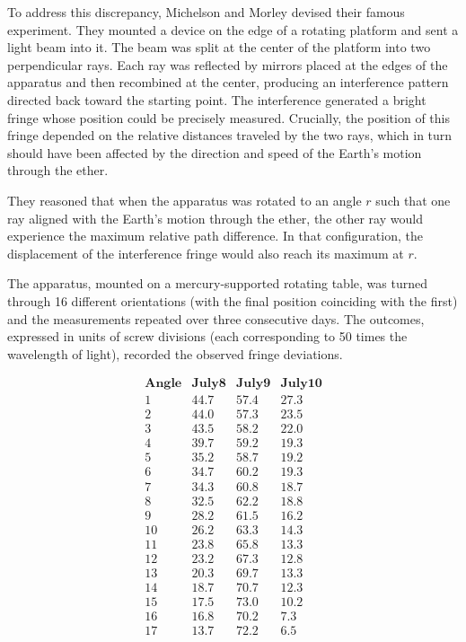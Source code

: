 \documentclass[
]{book}
\begin{document}
To address this discrepancy, Michelson and Morley devised their famous experiment. They mounted a device on the edge of a rotating platform and sent a light beam into it. The beam was split at the center of the platform into two perpendicular rays. Each ray was reflected by mirrors placed at the edges of the apparatus and then recombined at the center, producing an interference pattern directed back toward the starting point. The interference generated a bright fringe whose position could be precisely measured. Crucially, the position of this fringe depended on the relative distances traveled by the two rays, which in turn should have been affected by the direction and speed of the Earth's motion through the ether.

They reasoned that when the apparatus was rotated to an angle \(r\) such that one ray aligned with the Earth's motion through the ether, the other ray would experience the maximum relative path difference. In that configuration, the displacement of the interference fringe would also reach its maximum at \(r\).

The apparatus, mounted on a mercury-supported rotating table, was turned through 16 different orientations (with the final position coinciding with the first) and the measurements repeated over three consecutive days. The outcomes, expressed in units of screw divisions (each corresponding to 50 times the wavelength of light), recorded the observed fringe deviations.

\[
\begin{array}{cccc}
\mathbf{Angle} & \mathbf{July 8} & \mathbf{July 9} & \mathbf{July 10} \\ 
1&   44.7&  57.4&   27.3\\
2&   44.0&  57.3&   23.5\\
3&   43.5&  58.2&   22.0\\
4&   39.7&  59.2&   19.3\\
5&   35.2&  58.7&   19.2\\
6&   34.7&  60.2&   19.3\\
7&   34.3&  60.8&   18.7\\
8&   32.5&  62.2&   18.8\\
9&   28.2&  61.5&   16.2\\
10&  26.2&  63.3&   14.3\\
11&  23.8&  65.8&   13.3\\
12&  23.2&  67.3&   12.8\\
13&  20.3&  69.7&   13.3\\
14&  18.7&  70.7&   12.3\\
15&  17.5&  73.0&   10.2\\
16&  16.8&  70.2&    7.3\\
17&  13.7&  72.2&    6.5\\
\end{array}
\]
\end{document}

